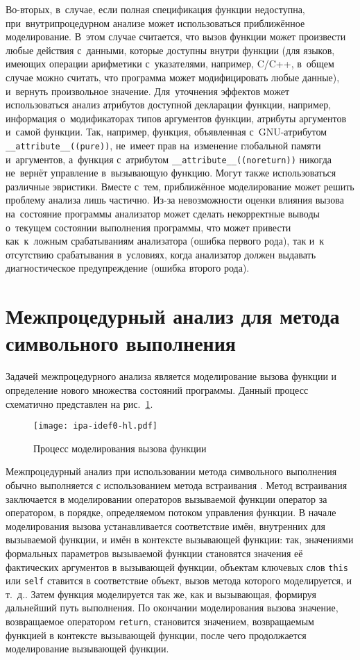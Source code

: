 Во-вторых, в~случае, если полная спецификация функции недоступна, при~внутрипроцедурном анализе может использоваться приближённое моделирование. В~этом случае считается, что вызов функции может произвести любые действия с~данными, которые доступны внутри функции (для языков, имеющих операции арифметики с~указателями, например, C/C++, в~общем случае можно считать, что программа может модифицировать любые данные), и~вернуть произвольное значение. Для~уточнения эффектов может использоваться анализ атрибутов доступной декларации функции, например, информация о~модификаторах типов аргументов функции, атрибуты аргументов и~самой функции. Так, например, функция, объявленная с~GNU-атрибутом \texttt{\_\_attribute\_\_((pure))}, не~имеет прав на~изменение глобальной памяти и~аргументов, а~функция с~атрибутом \texttt{\_\_attribute\_\_((noreturn))} никогда не~вернёт управление в~вызывающую функцию. Могут также использоваться различные эвристики. Вместе с~тем, приближённое моделирование может решить проблему анализа лишь частично. Из-за невозможности оценки влияния вызова на~состояние программы анализатор может сделать некорректные выводы о~текущем состоянии выполнения программы, что может привести как~к~ложным срабатываниям анализатора (ошибка первого рода), так и~к отсутствию срабатывания в~условиях, когда анализатор должен выдавать диагностическое предупреждение (ошибка второго рода).

\section{Межпроцедурный анализ для метода символьного выполнения}

Задачей межпроцедурного анализа является моделирование вызова функции и определение нового множества состояний программы. Данный процесс схематично представлен на рис.~\ref{pic:ipa-hl}.

\begin{figure}
   \centering
   \texttt{[image: ipa-idef0-hl.pdf]}
   \caption{Процесс моделирования вызова функции}\label{pic:ipa-hl}
\end{figure}

Межпроцедурный анализ при использовании метода символьного выполнения обычно выполняется с использованием метода встраивания \cite{dragon-book}. Метод встраивания заключается в моделировании операторов вызываемой функции оператор за оператором, в порядке, определяемом потоком управления функции. В начале моделирования вызова устанавливается соответствие имён, внутренних для вызываемой функции, и имён в контексте вызывающей функции: так, значениями формальных параметров вызываемой функции становятся значения её фактических аргументов в вызывающей функции, объектам ключевых слов \texttt{this} или \texttt{self} ставится в соответствие объект, вызов метода которого моделируется, и т.~д.. Затем функция моделируется так же, как и вызывающая, формируя дальнейший путь выполнения. По окончании моделирования вызова значение, возвращаемое оператором \texttt{return}, становится значением, возвращаемым функцией в контексте вызывающей функции, после чего продолжается моделирование вызывающей функции.

